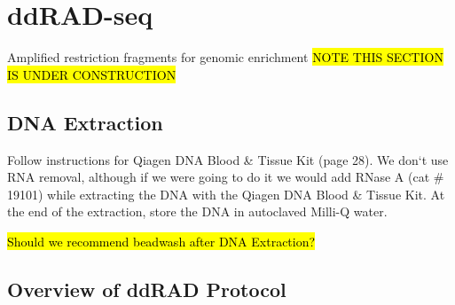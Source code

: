 \documentclass[11pt, oneside]{article}
\begin{document}
	\newpage
			
\section{ddRAD-seq}
	Amplified restriction fragments for genomic enrichment
\hl{NOTE THIS SECTION IS UNDER CONSTRUCTION}
		\vspace{5mm}

	\subsection {DNA Extraction}

		\begin{adjustwidth}{0.5in}{0pt} Follow instructions for Qiagen DNA Blood \& Tissue Kit (page 28).  We don`t use RNA removal, although if we 			were going to do it we would add RNase A (cat \# 19101) while extracting the DNA with the Qiagen DNA Blood \& Tissue Kit. At the end of the extraction, store the DNA in autoclaved Milli-Q water.  
		
		\hl{Should we recommend beadwash after DNA Extraction?}
		\end{adjustwidth}

\subsection {Overview of ddRAD Protocol}
\end{document}
